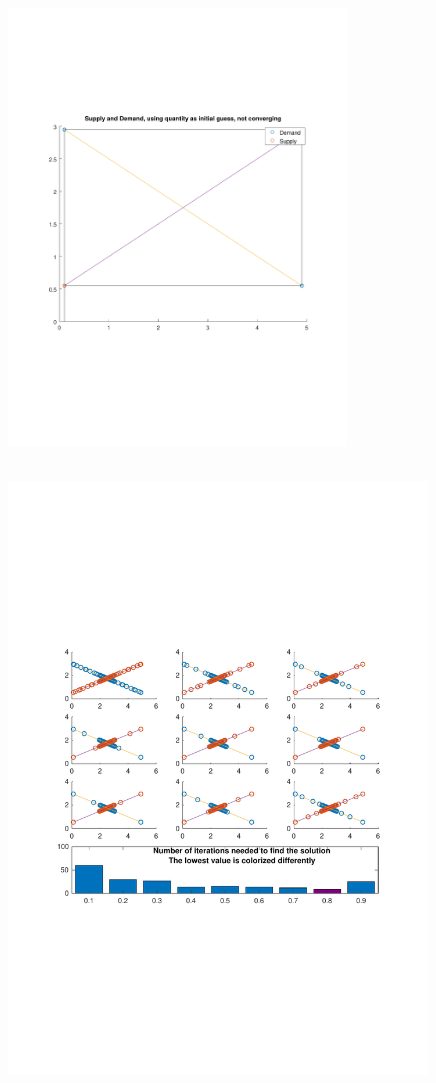 \documentclass{article}
\begin{document}

\begin{figure}[h!]
\centering
    \includegraphics[width=0.8\textwidth]{figure2}
\end{figure}


\subsection{}

\begin{figure}[h!]
\centering
    \includegraphics[width=0.99\textwidth]{figure3}
\end{figure}
\end{document}
